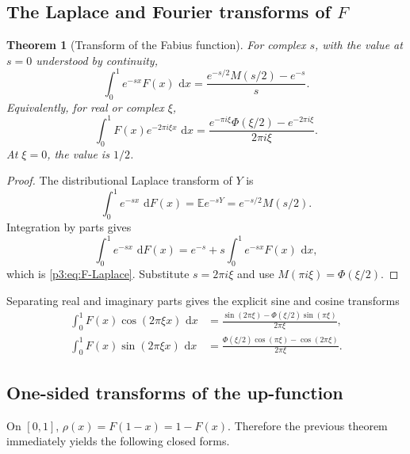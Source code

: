 \documentclass[11pt]{article}
\newtheorem{theorem}{Theorem}[section]
\theoremstyle{definition}
\theoremstyle{remark}
\newcommand{\E}{\mathbb E}
\newcommand{\dd}{\,\mathrm d}
\begin{document}
\subsection{The Laplace and Fourier transforms of \(F\)}

\begin{theorem}[Transform of the Fabius function]\label{p3:thm:F-transform}
For complex \(s\), with the value at \(s=0\) understood by continuity,
\begin{equation}
 \boxed{
 \int_0^1 e^{-sx}F(x)\,\dd x
 =\frac{e^{-s/2}M(s/2)-e^{-s}}{s}.
 }                                                           \label{p3:eq:F-Laplace}
\end{equation}
Equivalently, for real or complex \(\xi\),
\begin{equation}
 \boxed{
 \int_0^1F(x)e^{-2\pi i\xi x}\,\dd x
 =\frac{e^{-\pi i\xi}\Phi(\xi/2)-e^{-2\pi i\xi}}{2\pi i\xi}.
 }                                                           \label{p3:eq:F-Fourier}
\end{equation}
At \(\xi=0\), the value is \(1/2\).
\end{theorem}

\begin{proof}
The distributional Laplace transform of \(Y\) is
\begin{equation}
 \int_0^1 e^{-sx}\,\dd F(x)=\E e^{-sY}=e^{-s/2}M(s/2).       \label{p3:eq:dF-Laplace}
\end{equation}
Integration by parts gives
\[
 \int_0^1e^{-sx}\,\dd F(x)
 =e^{-s}+s\int_0^1e^{-sx}F(x)\,\dd x,
\]
which is \eqref{p3:eq:F-Laplace}.  Substitute \(s=2\pi i\xi\) and use
\(M(\pi i\xi)=\Phi(\xi/2)\).
\end{proof}

Separating real and imaginary parts gives the explicit sine and cosine transforms
\begin{align}
 \int_0^1F(x)\cos(2\pi\xi x)\,\dd x
 &=\frac{\sin(2\pi\xi)-\Phi(\xi/2)\sin(\pi\xi)}{2\pi\xi},    \label{p3:eq:F-cosine-transform}\\
 \int_0^1F(x)\sin(2\pi\xi x)\,\dd x
 &=\frac{\Phi(\xi/2)\cos(\pi\xi)-\cos(2\pi\xi)}{2\pi\xi}. \label{p3:eq:F-sine-transform}
\end{align}

\subsection{One-sided transforms of the up-function}

On \([0,1]\), \(\rho(x)=F(1-x)=1-F(x)\).  Therefore the previous theorem immediately
yields the following closed forms.
\end{document}
